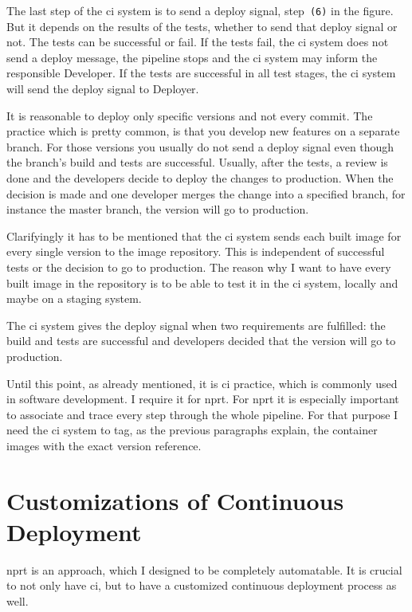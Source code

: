 The last step of the \gls{ci} system is to send a deploy signal, step~\texttt{(6)} in the
figure. But it depends on the results of the tests, whether to send that deploy signal or
not. The tests can be successful or fail. If the tests fail, the \gls{ci} system does not
send a deploy message, the pipeline stops and the \gls{ci} system may inform the
responsible Developer. If the tests are successful in all test stages, the \gls{ci} system
will send the deploy signal to Deployer.

It is reasonable to deploy only specific versions and not every commit. The practice which
is pretty common, is that you develop new features on a separate branch. For those
versions you usually do not send a deploy signal even though the branch's build and tests
are successful. Usually, after the tests, a review is done and the developers decide to deploy
the changes to production. When the decision is made and one developer merges the change
into a specified branch, for instance the master branch, the version will go to
production.

Clarifyingly it has to be mentioned that the \gls{ci} system sends each built image for every single
version to the image repository. This is independent of successful tests or the decision
to go to production. The reason why I want to have every built image in the repository is
to be able to test it in the \gls{ci} system, locally and maybe on a staging system.

The \gls{ci} system gives the deploy signal when two requirements are fulfilled: the build
and tests are successful and developers decided that the version will go to production.

Until this point, as already mentioned, it is \gls{ci} practice, which is commonly used
in software development. I require it for \gls{nprt}. For \gls{nprt} it is especially
important to associate and trace every step through the whole pipeline. For that purpose I
need the \gls{ci} system to tag, as the previous paragraphs explain, the container images
with the exact version reference.

\section{Customizations of Continuous Deployment}

\gls{nprt} is an approach, which I designed to be completely automatable. It is crucial to
not only have \gls{ci}, but to have a customized continuous deployment process as well.

